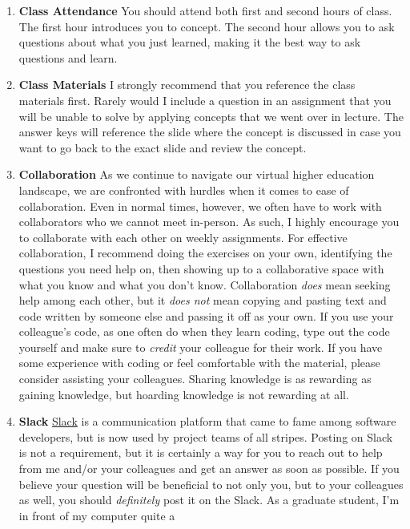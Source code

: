 \documentclass[11pt,]{article}
\begin{document}
\begin{enumerate}
\def\labelenumi{\arabic{enumi}.}
\item
  \textbf{Class Attendance} You should attend both first and second
  hours of class. The first hour introduces you to concept. The second
  hour allows you to ask questions about what you just learned, making
  it the best way to ask questions and learn.
\item
  \textbf{Class Materials} I strongly recommend that you reference the
  class materials first. Rarely would I include a question in an
  assignment that you will be unable to solve by applying concepts that
  we went over in lecture. The answer keys will reference the slide
  where the concept is discussed in case you want to go back to the
  exact slide and review the concept.
\item
  \textbf{Collaboration} As we continue to navigate our virtual higher
  education landscape, we are confronted with hurdles when it comes to
  ease of collaboration. Even in normal times, however, we often have to
  work with collaborators who we cannot meet in-person. As such, I
  highly encourage you to collaborate with each other on weekly
  assignments. For effective collaboration, I recommend doing the
  exercises on your own, identifying the questions you need help on,
  then showing up to a collaborative space with what you know and what
  you don't know. Collaboration \emph{does} mean seeking help among each
  other, but it \emph{does not} mean copying and pasting text and code
  written by someone else and passing it off as your own. If you use
  your colleague's code, as one often do when they learn coding, type
  out the code yourself and make sure to \emph{credit} your colleague
  for their work. If you have some experience with coding or feel
  comfortable with the material, please consider assisting your
  colleagues. Sharing knowledge is as rewarding as gaining knowledge,
  but hoarding knowledge is not rewarding at all.
\item
  \textbf{Slack} \href{https://slack.com/}{Slack} is a communication
  platform that came to fame among software developers, but is now used
  by project teams of all stripes. Posting on Slack is not a
  requirement, but it is certainly a way for you to reach out to help
  from me and/or your colleagues and get an answer as soon as possible.
  If you believe your question will be beneficial to not only you, but
  to your colleagues as well, you should \emph{definitely} post it on
  the Slack. As a graduate student, I'm in front of my computer quite a

\end{enumerate}
\end{document}
